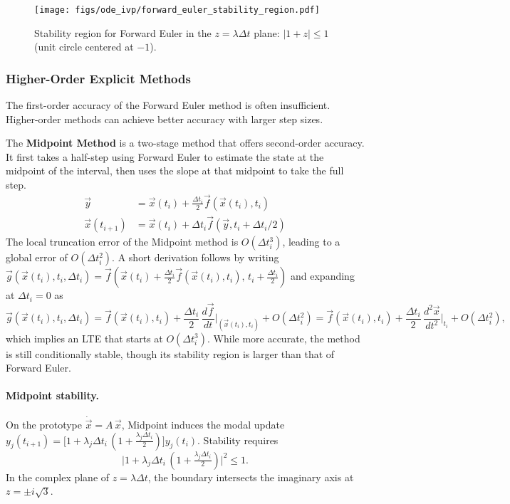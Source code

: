 \begin{figure}[h!]
    \centering
    \texttt{[image: figs/ode\_ivp/forward\_euler\_stability\_region.pdf]}
    \caption{Stability region for Forward Euler in the $z=\lambda\Delta t$ plane: $|1+z|\le 1$ (unit circle centered at $-1$).}
    \label{fig:forward-euler-stability}
\end{figure}

\subsubsection{Higher-Order Explicit Methods}
\label{subsec:ivp-higher-order-explicit}
The first-order accuracy of the Forward Euler method is often insufficient. Higher-order methods can achieve better accuracy with larger step sizes.

The \textbf{Midpoint Method} is a two-stage method that offers second-order accuracy. It first takes a half-step using Forward Euler to estimate the state at the midpoint of the interval, then uses the slope at that midpoint to take the full step.
\begin{align}
    \vec{y} &= \vec{x}(t_i) + \frac{\Delta t_i}{2} \vec{f}(\vec{x}(t_i), t_i) \\
    \vec{x}(t_{i+1}) &= \vec{x}(t_i) + \Delta t_i \vec{f}(\vec{y}, t_i + \Delta t_i / 2)
\end{align}
The local truncation error of the Midpoint method is $O(\Delta t_i^3)$, leading to a global error of $O(\Delta t_i^2)$. A short derivation follows by writing $\vec{g}(\vec{x}(t_i),t_i,\Delta t_i)=\vec{f}(\vec{x}(t_i)+\tfrac{\Delta t_i}{2}\vec{f}(\vec{x}(t_i),t_i),\,t_i+\tfrac{\Delta t_i}{2})$ and expanding at $\Delta t_i=0$ as
\begin{equation}
    \vec{g}(\vec{x}(t_i),t_i,\Delta t_i) = \vec{f}(\vec{x}(t_i),t_i) + \frac{\Delta t_i}{2}\,\frac{d\vec{f}}{dt}\bigg|_{(\vec{x}(t_i),t_i)} + O(\Delta t_i^2) = \vec{f}(\vec{x}(t_i),t_i) + \frac{\Delta t_i}{2}\,\frac{d^2\vec{x}}{dt^2}\bigg|_{t_i} + O(\Delta t_i^2),
\end{equation}
which implies an LTE that starts at $O(\Delta t_i^3)$. While more accurate, the method is still conditionally stable, though its stability region is larger than that of Forward Euler.

\paragraph{Midpoint stability.} On the prototype $\dot{\vec{x}}=A\,\vec{x}$, Midpoint induces the modal update $y_j(t_{i+1})=\big[1+\lambda_j\Delta t_i\,(1+\tfrac{\lambda_j\Delta t_i}{2})\big]y_j(t_i)$. Stability requires
\begin{equation}
    \big|1+\lambda_j\Delta t_i\,(1+\tfrac{\lambda_j\Delta t_i}{2})\big|^2 \le 1.
\end{equation}
In the complex plane of $z=\lambda\Delta t$, the boundary intersects the imaginary axis at $z=\pm i\sqrt{3}$.

